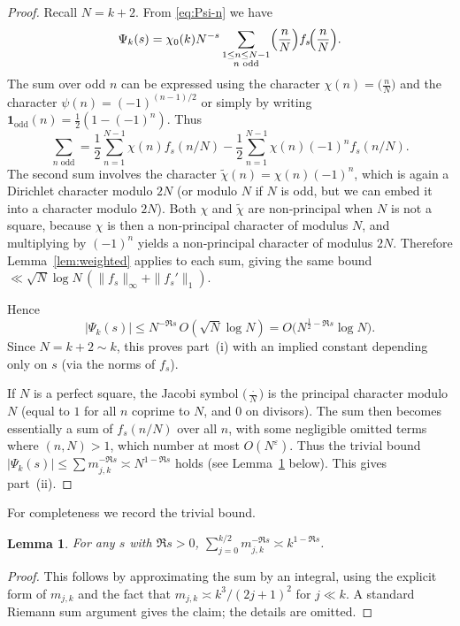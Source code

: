 \documentclass[11pt,a4paper]{article}
\newtheorem{lemma}[theorem]{Lemma}
\theoremstyle{definition}
\theoremstyle{remark}
\begin{document}
\begin{proof}
Recall $N=k+2$.  From \eqref{eq:Psi-n} we have
\[
\Psi_k(s)=\chi_0(k)N^{-s}\sum_{\substack{1\le n\le N-1\\ n\text{ odd}}}
          \Bigl(\frac{n}{N}\Bigr)f_s\!\Bigl(\frac{n}{N}\Bigr).
\]
The sum over odd $n$ can be expressed using the character $\chi(n)=\bigl(\frac{n}{N}\bigr)$
and the character $\psi(n)=(-1)^{(n-1)/2}$ or simply by writing
$\mathbf 1_{\text{odd}}(n)=\frac12(1-(-1)^n)$.
Thus
\[
\sum_{n\text{ odd}} = \frac12\sum_{n=1}^{N-1}\chi(n)f_s(n/N)
                    - \frac12\sum_{n=1}^{N-1}\chi(n)(-1)^n f_s(n/N).
\]
The second sum involves the character $\widetilde\chi(n)=\chi(n)(-1)^n$, which is again a
Dirichlet character modulo $2N$ (or modulo $N$ if $N$ is odd, but we can embed it into
a character modulo $2N$).  Both $\chi$ and $\widetilde\chi$ are non‑principal when
$N$ is not a square, because $\chi$ is then a non‑principal character of modulus $N$,
and multiplying by $(-1)^n$ yields a non‑principal character of modulus $2N$.
Therefore Lemma~\ref{lem:weighted} applies to each sum, giving the same bound
$\ll\sqrt{N}\log N\,(\|f_s\|_\infty+\|f_s'\|_1)$.

Hence
\[
|\Psi_k(s)|\le N^{-\Re s}\, O(\sqrt{N}\log N)
          = O\bigl(N^{\frac12-\Re s}\log N\bigr).
\]
Since $N=k+2\sim k$, this proves part~(i) with an implied constant depending only on $s$
(via the norms of $f_s$).

If $N$ is a perfect square, the Jacobi symbol $\bigl(\frac{\cdot}{N}\bigr)$ is the
principal character modulo $N$ (equal to $1$ for all $n$ coprime to $N$, and $0$ on
divisors).  The sum then becomes essentially a sum of $f_s(n/N)$ over all $n$, with
some negligible omitted terms where $(n,N)>1$, which number at most $O(N^\varepsilon)$.
Thus the trivial bound $|\Psi_k(s)|\le \sum m_{j,k}^{-\Re s} \asymp N^{1-\Re s}$ holds
(see Lemma~\ref{lem:trivial} below).  This gives part~(ii).
\end{proof}

For completeness we record the trivial bound.

\begin{lemma}\label{lem:trivial}
For any $s$ with $\Re s>0$, $\displaystyle\sum_{j=0}^{k/2} m_{j,k}^{-\Re s}\asymp k^{1-\Re s}$.
\end{lemma}
\begin{proof}
This follows by approximating the sum by an integral, using the explicit form of $m_{j,k}$
and the fact that $m_{j,k}\asymp k^3/(2j+1)^2$ for $j\ll k$.  A standard Riemann sum
argument gives the claim; the details are omitted.
\end{proof}
\end{document}
